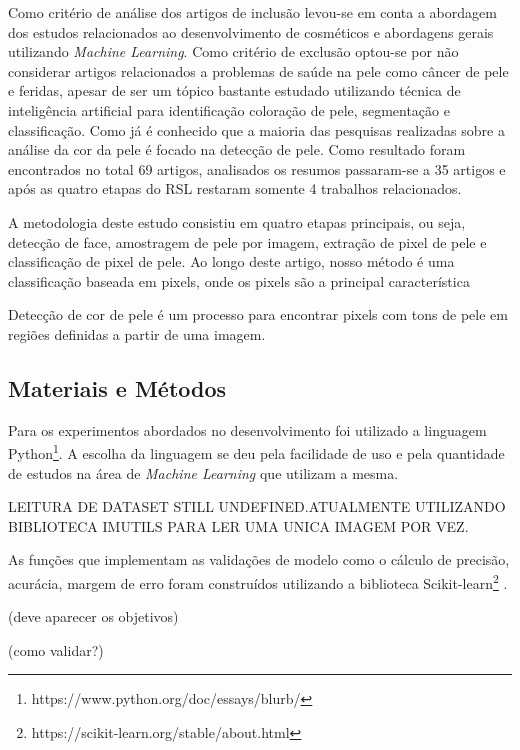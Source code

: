 Como critério de análise dos artigos de inclusão levou-se em conta a abordagem dos estudos relacionados ao desenvolvimento de cosméticos e abordagens gerais utilizando \textit{Machine Learning}. Como critério de exclusão optou-se por não considerar artigos relacionados a problemas de saúde na pele como câncer de pele e feridas, apesar de ser um tópico bastante estudado utilizando técnica de inteligência artificial para identificação coloração de pele, segmentação e classificação. Como já é conhecido que a maioria das pesquisas realizadas sobre a análise da cor da pele é focado na detecção de pele\cite{A_survey_of_skin-color_modeling_and_detection_methods}. Como resultado foram encontrados no total 69 artigos, analisados os resumos passaram-se a 35 artigos e após as quatro etapas do RSL restaram somente 4 trabalhos relacionados.

A metodologia deste estudo consistiu em quatro
etapas principais, ou seja, detecção de face, amostragem de pele por imagem, extração de pixel de pele e classificação de pixel de pele. Ao
longo deste artigo, nosso método é uma classificação baseada em
pixels, onde os pixels são a principal característica



Detecção de cor de pele é um processo para encontrar pixels com tons de pele em regiões definidas a partir de uma imagem. 

\subsection{Materiais e Métodos}
Para os experimentos abordados no desenvolvimento foi utilizado a linguagem Python\footnote{https://www.python.org/doc/essays/blurb/}. A escolha da linguagem se deu pela facilidade de uso e pela quantidade de estudos na área de \textit{Machine Learning} que utilizam a mesma.

LEITURA DE DATASET STILL UNDEFINED.ATUALMENTE UTILIZANDO BIBLIOTECA IMUTILS PARA LER UMA UNICA IMAGEM POR VEZ.





As funções que implementam as validações de modelo como o cálculo de precisão, acurácia, margem de erro foram construídos utilizando a biblioteca Scikit-learn\footnote{https://scikit-learn.org/stable/about.html} . 




(deve aparecer os objetivos)

(como validar?)
